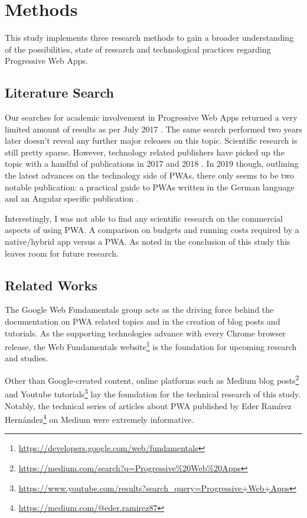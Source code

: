 \chapter{Methods}

This study implements three research methods to gain a broader understanding of the possibilities, state of research and technological practices regarding Progressive Web Apps.

\section{Literature Search}

Our searches for academic involvement in Progressive Web Apps returned a very limited amount of results as per July 2017 \citep{biorn-hansenProgressiveWebApps2018}. The same search performed two years later doesn't reveal any further major releases on this topic. Scientific research is still pretty sparse. However, technology related publishers have picked up the topic with a handful of publications in 2017 and 2018 \citep{aterBuildingProgressiveWeb2017,humeProgressiveWebApps2018,loveProgressiveWebApplication2018,sheppardBeginningProgressiveWeb2017}. In 2019 though, outlining the latest advances on the technology side of PWAs, there only seems to be two notable publication: a practical guide to PWAs written in the German language \citep{liebelProgressiveWebApps2019} and an Angular specific publication \citep{hajianProgressiveWebApps2019}.

Interestingly, I was not able to find any scientific research on the commercial aspects of using PWA. A comparison on budgets and running costs required by a native/hybrid app versus a PWA. As noted in the conclusion of this study this leaves room for future research.

\section{Related Works}
The Google Web Fundamentals group acts as the driving force behind the documentation on PWA related topics and in the creation of blog posts and tutorials. As the supporting technologies advance with every Chrome browser release, the Web Fundamentals website\footnote{\url{https://developers.google.com/web/fundamentals}} is the foundation for upcoming research and studies.

Other than Google-created content, online platforms such as Medium blog posts\footnote{\url{https://medium.com/search?q=Progressive\%20Web\%20Apps}} and Youtube tutorials\footnote{\url{https://www.youtube.com/results?search_query=Progressive+Web+Apps}} lay the foundation for the technical research of this study. Notably, the technical series of articles about PWA published by Eder Ramírez Hernández\footnote{\url{https://medium.com/@eder.ramirez87}} on Medium were extremely informative.

